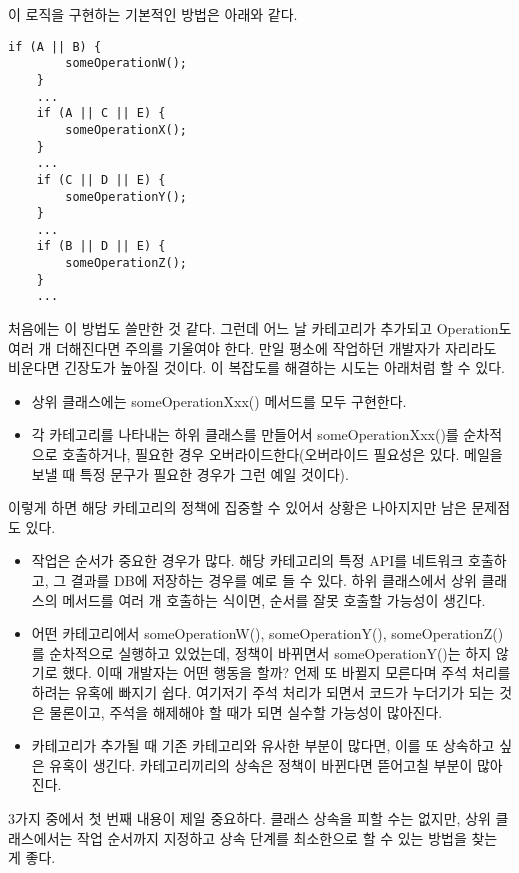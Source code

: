 이 로직을 구현하는 기본적인 방법은 아래와 같다.
\begin{lstlisting}[frame=single]
	if (A || B) { 
		someOperationW(); 
	}
	...
	if (A || C || E) { 
		someOperationX(); 
	}
	...
	if (C || D || E) { 
		someOperationY(); 
	} 
	...
	if (B || D || E) { 
		someOperationZ(); 
	}
	...
\end{lstlisting}
처음에는 이 방법도 쓸만한 것 같다.
그런데 어느 날 카테고리가 추가되고 Operation도 여러 개 더해진다면 주의를 기울여야 한다.
만일 평소에 작업하던 개발자가 자리라도 비운다면 긴장도가 높아질 것이다. 
이 복잡도를 해결하는 시도는 아래처럼 할 수 있다.
\begin{itemize}
\item 상위 클래스에는 someOperationXxx() 메서드를 모두 구현한다.
\item 각 카테고리를 나타내는 하위 클래스를 만들어서 someOperationXxx()를 순차적으로 호출하거나, 필요한 경우 오버라이드한다(오버라이드 필요성은 있다. 메일을 보낼 때 특정 문구가 필요한 경우가 그런 예일 것이다).
\end{itemize}

이렇게 하면 해당 카테고리의 정책에 집중할 수 있어서 상황은 나아지지만 남은 문제점도 있다.
\begin{itemize}
\item 작업은 순서가 중요한 경우가 많다. 해당 카테고리의 특정 API를 네트워크 호출하고, 그 결과를 DB에 저장하는 경우를 예로 들 수 있다.
하위 클래스에서 상위 클래스의 메서드를 여러 개 호출하는 식이면, 순서를 잘못 호출할 가능성이 생긴다.

\item 어떤 카테고리에서 someOperationW(), someOperationY(), someOperationZ()를 순차적으로 실행하고 있었는데, 정책이 바뀌면서 someOperationY()는 하지 않기로 했다. 이때 개발자는 어떤 행동을 할까? 
언제 또 바뀔지 모른다며 주석 처리를 하려는 유혹에 빠지기 쉽다. 여기저기 주석 처리가 되면서 코드가 누더기가 되는 것은 물론이고, 주석을 해제해야 할 때가 되면 실수할 가능성이 많아진다.

\item 카테고리가 추가될 때 기존 카테고리와 유사한 부분이 많다면, 이를 또 상속하고 싶은 유혹이 생긴다.
카테고리끼리의 상속은 정책이 바뀐다면 뜯어고칠 부분이 많아진다.
 
\end{itemize}

3가지 중에서 첫 번째 내용이 제일 중요하다. 
클래스 상속을 피할 수는 없지만, 상위 클래스에서는 작업 순서까지 지정하고 상속 단계를 최소한으로 할 수 있는 방법을 찾는 게 좋다.\\

